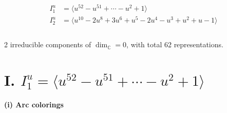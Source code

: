 \documentclass[1p]{elsarticle_modified}
\theoremstyle{definition}
\begin{document}
\begin{align*}
I^u_{1}&=\langle 
u^{52}- u^{51}+\cdots- u^2+1\rangle \\
I^u_{2}&=\langle 
u^{10}-2 u^8+3 u^6+u^5-2 u^4- u^3+u^2+u-1\rangle \\
\\
\end{align*}
\raggedright * 2 irreducible components of $\dim_{\mathbb{C}}=0$, with total 62 representations.\\
\newpage
\renewcommand{\arraystretch}{1}
\centering \section*{I. $I^u_{1}= \langle u^{52}- u^{51}+\cdots- u^2+1 \rangle$}
\flushleft \textbf{(i) Arc colorings}\\
\end{document}
